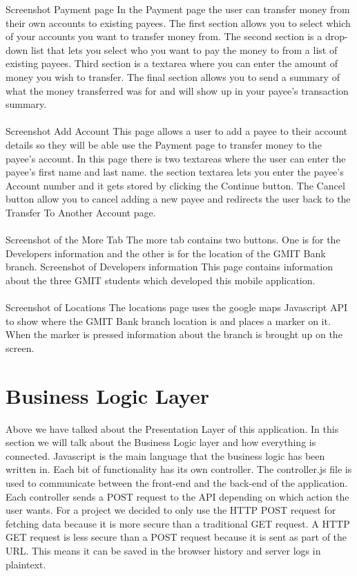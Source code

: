 Screenshot Payment page
In the Payment page the user can transfer money from their own accounts to existing payees. The first section allows you to select which of your accounts you want to transfer money from. The second section is a drop-down list that lets you select who you want to pay the money to from a list of existing payees. Third section is a textarea where you can enter the amount of money you wish to transfer. The final section allows you to send a summary of what the money transferred was for and will show up in your payee’s transaction summary. \paragraph{}
Screenshot Add Account
This page allows a user to add a payee to their account details so they will be able use the Payment page to transfer money to the payee’s account. In this page there is two textareas where the user can enter the payee’s first name and last name. the section textarea lets you enter the payee’s Account number and it gets stored by clicking the Continue button. The Cancel button allow you to cancel adding a new payee and redirects the user back to the Transfer To Another Account page.\paragraph{}
Screenshot of the More Tab
The more tab contains two buttons. One is for the Developers information and the other is for the location of the GMIT Bank branch.
Screenshot of Developers information
This page contains information about the three GMIT students which developed this mobile application.\paragraph{}
Screenshot of Locations
The locations page uses the google maps Javascript API to show where the GMIT Bank branch location is and places a marker on it. When the marker is pressed information about the branch is brought up on the screen.

\section{Business Logic Layer}
Above we have talked about the Presentation Layer of this application. In this section we will talk about the Business Logic layer and how everything is connected. Javascript is the main language that the business logic has been written in. Each bit of functionality has its own controller. The controller.js file is used to communicate between the front-end and the back-end of the application.  Each controller sends a POST request to the API depending on which action the user wants. For a project we decided to only use the HTTP POST request for fetching data because it is more secure than a traditional GET request. A HTTP GET request is less secure than a POST request because it is sent as part of the URL. This means it can be saved in the browser history and server logs in plaintext.\cite{http}

